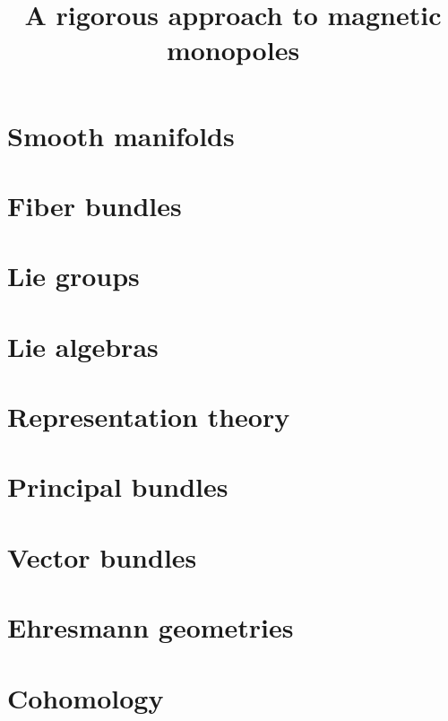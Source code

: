 \documentclass[12pt,a4paper]{report}
\title{A rigorous approach to magnetic monopoles}
\theoremstyle{definition}
\theoremstyle{Theorem}
\theoremstyle{definition}
\theoremstyle{definition}
\begin{document}
	\tableofcontents
	\chapter{Smooth manifolds}
	\chapter{Fiber bundles}
	\chapter{Lie groups}
	\chapter{Lie algebras}
	\chapter{Representation theory}
	\chapter{Principal bundles}
	\chapter{Vector bundles}
	\chapter{Ehresmann geometries}
	\chapter{Cohomology}
\end{document}
